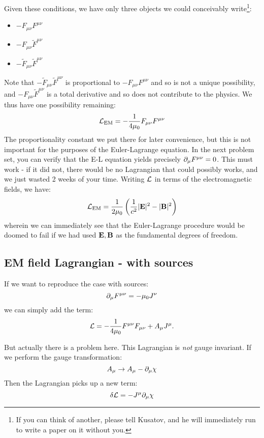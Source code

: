 Given these conditions, we have only three objects we could conceivably write\footnote{If you can think of another, please tell Kusatov, and he will immediately run to write a paper on it without you.}:
\begin{itemize}
    \item $-F_{\mu\nu}F^{\mu\nu}$
    \item $-F_{\mu\nu}\tilde{F}^{\mu\nu}$
    \item $-\tilde{F}_{\mu\nu}\tilde{F}^{\mu\nu}$
\end{itemize}
Note that $-\tilde{F}_{\mu\nu}\tilde{F}^{\mu\nu}$ is proportional to $-F_{\mu\nu}F^{\mu\nu}$ and so is not a unique possibility, and $-F_{\mu\nu}\tilde{F}^{\mu\nu}$ is a total derivative and so does not contribute to the physics. We thus have one possibility remaining:
\begin{equation}
    \mathcal{L}_{\text{EM}} = -\frac{1}{4\mu_0}F_{\mu\nu}F^{\mu\nu}
\end{equation}
The proportionality constant we put there for later convenience, but this is not important for the purposes of the Euler-Lagrange equation. In the next problem set, you can verify that the E-L equation yields precisely $\partial_{\mu}F^{\mu\nu} = 0$. This must work - if it did not, there would be no Lagrangian that could possibly works, and we just wasted 2 weeks of your time. Writing $\mathcal{L}$ in terms of the electromagnetic fields, we have:
\begin{equation}
    \mathcal{L}_{\text{EM}} = \frac{1}{2\mu_0}\left(\frac{1}{c^2}\lvert \mathbf{E} \rvert^2 - \lvert \mathbf{B} \rvert^2\right)
\end{equation}
wherein we can immediately see that the Euler-Lagrange procedure would be doomed to fail if we had used $\mathbf{E}, \mathbf{B}$ as the fundamental degrees of freedom.

\subsection{EM field Lagrangian - with sources}
If we want to reproduce the case with sources:
\begin{equation}
    \partial_{\mu}F^{\mu\nu} = -\mu_0 J^\nu
\end{equation}
we can simply add the term:
\begin{equation}
    \mathcal{L} = -\frac{1}{4\mu_0}F^{\mu\nu}F_{\mu\nu} + A_\mu J^\mu.
\end{equation}

But actually there is a problem here. This Lagrangian is \emph{not} gauge invariant. If we perform the gauge transformation:
\begin{equation}
    A_\mu \to A_\mu - \partial_\mu \chi
\end{equation}
Then the Lagrangian picks up a new term:
\begin{equation}
    \delta \mathcal{L} = -J^\mu \partial_\mu \chi
\end{equation}

